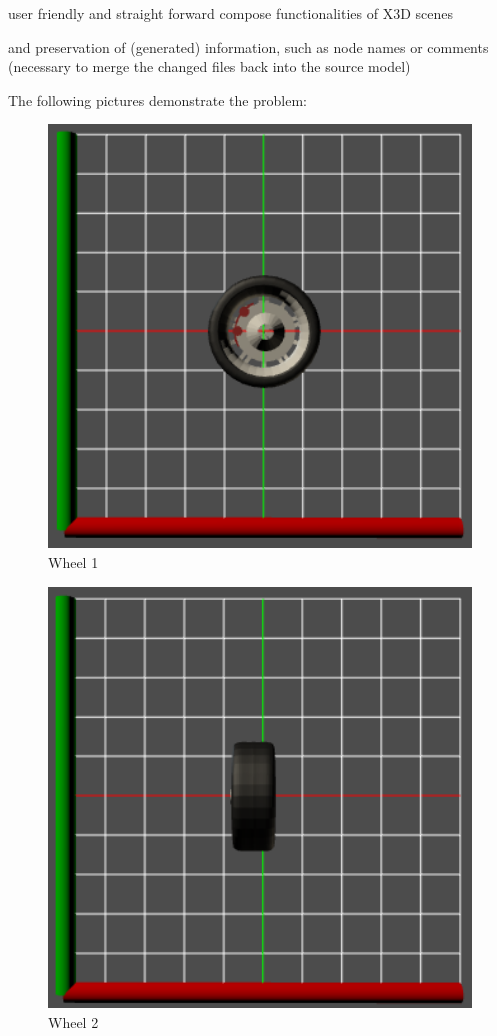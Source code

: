 \begin{itemize*}
\item
  user friendly and straight forward compose functionalities of X3D
  scenes
\item
  and preservation of (generated) information, such as node names or
  comments (necessary to merge the changed files back into the source
  model)
\end{itemize*}

The following pictures demonstrate the problem:\\
\begin{figure}[htbp]
  \includegraphics[width=12cm]{../assets/wheel1.png}
	\caption{Wheel 1}
	\label{fig:wheel1}
\end{figure}
\begin{figure}[htbp]
	\includegraphics[width=12cm]{../assets/wheel2.png}
	\caption{Wheel 2}
	\label{fig:wheel2}
\end{figure}
